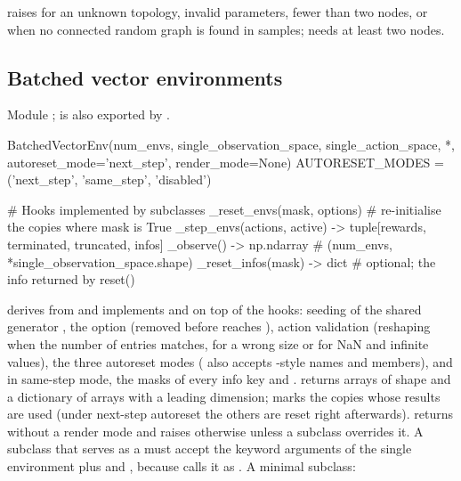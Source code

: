  raises  for an unknown topology, invalid
parameters, fewer than two nodes, or when no connected random graph is found
in  samples;  needs at least
two nodes.

\subsection{Batched vector environments}\label{sec:api-vector}

Module ;  is also exported by
.

\begin{pycode}
BatchedVectorEnv(num_envs, single_observation_space, single_action_space, *,
                 autoreset_mode='next_step', render_mode=None)
AUTORESET_MODES = ('next_step', 'same_step', 'disabled')

# Hooks implemented by subclasses
_reset_envs(mask, options)          # re-initialise the copies where mask is True
_step_envs(actions, active) -> tuple[rewards, terminated, truncated, infos]
_observe() -> np.ndarray            # (num_envs, *single_observation_space.shape)
_reset_infos(mask) -> dict          # optional; the info returned by reset()
\end{pycode}

 derives from  and
implements  and  on top of the hooks: seeding of the
shared generator , the  option
(removed before  reaches ), action
validation (reshaping when the number of entries matches, 
for a wrong size or for NaN and infinite values), the three autoreset modes
( also accepts -style names and
 members),  and
 in same-step mode, the  masks of
every info key and .  returns arrays
of shape  and a dictionary of arrays with a leading
 dimension;  marks the copies whose results are
used (under next-step autoreset the others are reset right afterwards).
 returns  without a render mode and raises
 otherwise unless a subclass overrides it. A
subclass that serves as a  must accept the keyword
arguments of the single environment plus  and
, because  calls it as
. A
minimal subclass:

